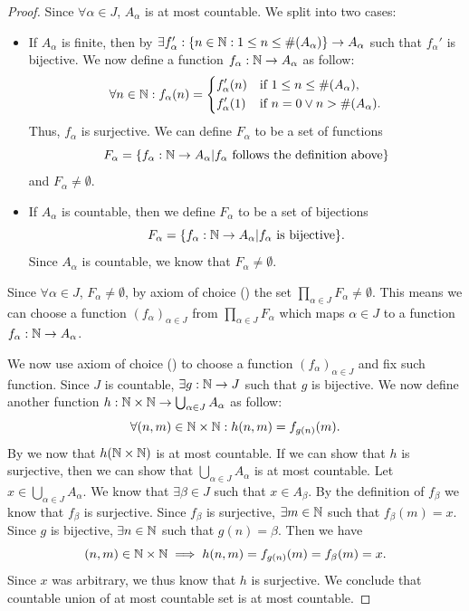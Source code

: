 \begin{proof}
  Since \(\forall \alpha \in J\), \(A_{\alpha}\) is at most countable.
  We split into two cases:
  \begin{itemize}
    \item If \(A_{\alpha}\) is finite, then by  \(\exists f_{\alpha}' : \left\lbrace n \in \mathbb{N} : 1 \leq n \leq \#(A_{\alpha})\right\rbrace \to A_{\alpha}\) such that \(f_{\alpha}'\) is bijective.
          We now define a function \(f_{\alpha} : \mathbb{N} \to A_{\alpha}\) as follow:
          \[
            \forall n \in \mathbb{N} : f_{\alpha}(n) = \begin{dcases}
              f_{\alpha}'(n) & \text{if } 1 \leq n \leq \#(A_{\alpha}),  \\
              f_{\alpha}'(1) & \text{if } n = 0 \lor n > \#(A_{\alpha}).
            \end{dcases}
          \]
          Thus, \(f_{\alpha}\) is surjective.
          We can define \(F_{\alpha}\) to be a set of functions
          \[
            F_{\alpha} = \left\lbrace f_{\alpha} : \mathbb{N} \to A_{\alpha} | f_{\alpha} \text{ follows the definition above}\right\rbrace
          \]
          and \(F_{\alpha} \neq \emptyset\).
    \item If \(A_{\alpha}\) is countable, then we define \(F_{\alpha}\) to be a set of bijections
          \[
            F_{\alpha} = \set{f_{\alpha} : \N \to A_{\alpha} | f_{\alpha} \text{ is bijective}}.
          \]
          Since \(A_{\alpha}\) is countable, we know that \(F_{\alpha} \neq \emptyset\).
  \end{itemize}
  Since \(\forall \alpha \in J\), \(F_{\alpha} \neq \emptyset\), by axiom of choice () the set \(\prod_{\alpha \in J} F_{\alpha} \neq \emptyset\).
  This means we can choose a function \((f_{\alpha})_{\alpha \in J}\) from \(\prod_{\alpha \in J} F_{\alpha}\) which maps \(\alpha \in J\) to a function \(f_{\alpha} : \mathbb{N} \to A_{\alpha}\).

  We now use axiom of choice () to choose a function \((f_{\alpha})_{\alpha \in J}\) and fix such function.
  Since \(J\) is countable, \(\exists g : \mathbb{N} \to J\) such that \(g\) is bijective.
  We now define another function \(h : \mathbb{N} \times \mathbb{N} \to \bigcup_{\alpha \in J} A_{\alpha}\) as follow:
  \[
    \forall (n, m) \in \mathbb{N} \times \mathbb{N} : h(n, m) = f_{g(n)}(m).
  \]
  By  we now that \(h(\mathbb{N} \times \mathbb{N})\) is at most countable.
  If we can show that \(h\) is surjective, then we can show that \(\bigcup_{\alpha \in J} A_{\alpha}\) is at most countable.
  Let \(x \in \bigcup_{\alpha \in J} A_{\alpha}\).
  We know that \(\exists \beta \in J\) such that \(x \in A_{\beta}\).
  By the definition of \(f_{\beta}\) we know that \(f_{\beta}\) is surjective.
  Since \(f_{\beta}\) is surjective, \(\exists m \in \mathbb{N}\) such that \(f_{\beta}(m) = x\).
  Since \(g\) is bijective, \(\exists n \in \mathbb{N}\) such that \(g(n) = \beta\).
  Then we have
  \[
    (n, m) \in \mathbb{N} \times \mathbb{N} \implies h(n, m) = f_{g(n)}(m) = f_{\beta}(m) = x.
  \]
  Since \(x\) was arbitrary, we thus know that \(h\) is surjective.
  We conclude that countable union of at most countable set is at most countable.


\end{proof}
